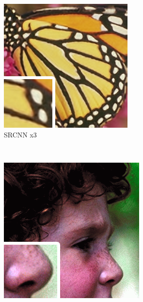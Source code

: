 \documentclass[
			fontsize = 12pt,
			paper = a4
			]
			{scrartcl}%
\newcommand{\?}{\ensuremath{^\texttt{\textbf [CITATION~NEEDED]}}}
\begin{document}
\begin{figure}[!ht]
\begin{subfigure}[b]{0.3\textwidth}
     \end{subfigure}
     \hfill
     \begin{subfigure}[b]{0.3\textwidth}
         \centering
         \caption{SRCNN x3}
         \includegraphics[width=\textwidth]{fig/examples/butterfly_srcnn_x3}
     \end{subfigure}\\
     \vspace{5mm}
     \begin{subfigure}[b]{0.3\textwidth}
         \centering
         \includegraphics[width=\textwidth]{fig/examples/head_GT}

\end{subfigure}
\end{figure}
\end{document}
